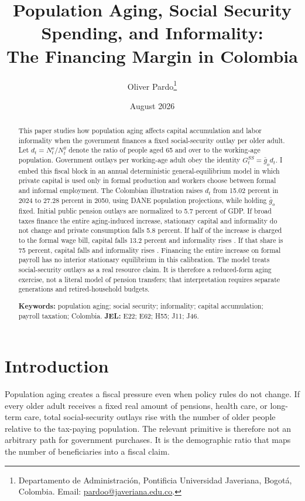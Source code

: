 \documentclass[12pt]{article}
\title{\textbf{Population Aging, Social Security Spending, and Informality:}\\
\large The Financing Margin in Colombia}
\author{
  Oliver Pardo\thanks{
    Departamento de Administraci{\'o}n, Pontificia Universidad Javeriana,
    Bogot{\'a}, Colombia.
    Email: \href{mailto:pardoo@javeriana.edu.co}{pardoo@javeriana.edu.co}.
  }
}
\date{August 2026}
\begin{document}
\maketitle

\begin{abstract}\small\sloppy
\noindent
This paper studies how population aging affects capital accumulation and labor
informality when the government finances a fixed social-security outlay per
older adult. Let $d_t=N_t^o/N_t^y$ denote the ratio of people aged 65 and over
to the working-age population. Government outlays per working-age adult obey
the identity $G_t^{SS}=\bar g_o d_t$. I embed this fiscal block in an annual
deterministic general-equilibrium model in which private capital is used only
in formal production and workers choose between formal and informal
employment. The Colombian illustration raises $d_t$ from 15.02 percent in 2024
to 27.28 percent in 2050, using DANE population projections, while holding
$\bar g_o$ fixed. Initial public pension outlays are normalized to 5.7 percent
of GDP. If broad taxes finance the entire aging-induced increase, stationary
capital and informality do not change and private consumption falls 5.8
percent. If half of the increase is charged to the formal wage bill, capital
falls 13.2 percent and informality rises \MixedInformalityChange. If that
share is 75 percent, capital falls \PayrollCapitalChange{} and informality
rises \PayrollInformalityChange. Financing the entire increase on formal
payroll has no interior stationary equilibrium in this calibration. The model
treats social-security outlays as a real resource claim. It is therefore a
reduced-form aging exercise, not a literal model of pension transfers; that
interpretation requires separate generations and retired-household budgets.

\medskip\noindent
\textbf{Keywords:} population aging; social security; informality; capital
accumulation; payroll taxation; Colombia.
\quad
\textbf{JEL:} E22; E62; H55; J11; J46.
\end{abstract}\fussy

\section{Introduction}

Population aging creates a fiscal pressure even when policy rules do not
change. If every older adult receives a fixed real amount of pensions, health
care, or long-term care, total social-security outlays rise with the number of
older people relative to the tax-paying population. The relevant primitive is
therefore not an arbitrary path for government purchases. It is the
demographic ratio that maps the number of beneficiaries into a fiscal claim.
\end{document}
